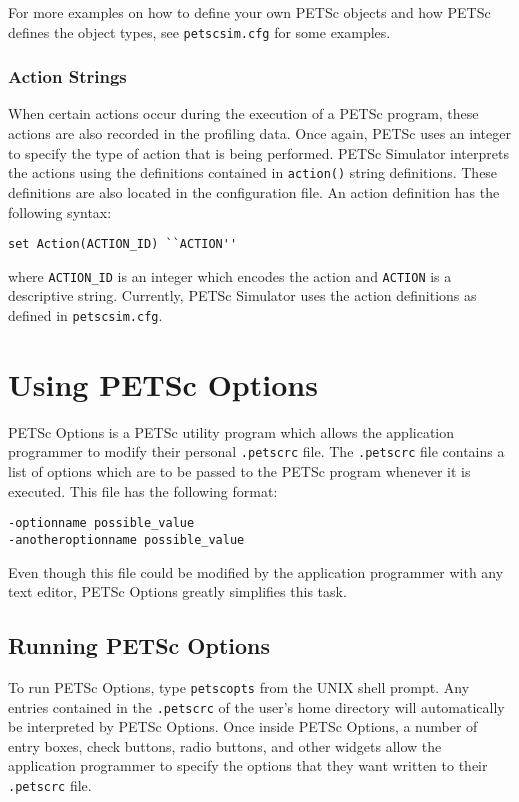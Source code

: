 For more examples on how to define your own PETSc objects and how PETSc defines the object types, see {\tt petscsim.cfg} for some examples.

\subsubsection{Action Strings}

When certain actions occur during the execution of a PETSc program, these actions are also recorded in the profiling data.  Once again, PETSc uses an integer to specify the type of action that is being performed.  PETSc Simulator interprets the actions using the definitions contained in {\tt action()} string definitions.  These definitions are also located in the configuration file.  An action definition has the following syntax:
\begin{verbatim}
set Action(ACTION_ID) ``ACTION''
\end{verbatim}
where {\tt ACTION\_ID} is an integer which encodes the action and {\tt ACTION} is a descriptive string.  Currently, PETSc Simulator uses the action definitions as defined in {\tt petscsim.cfg}.

\newpage

\section{Using PETSc Options}

PETSc Options is a PETSc utility program which allows the application programmer to modify their personal {\tt .petscrc} file.  The {\tt .petscrc} file contains a list of options which are to be passed to the PETSc program whenever it is executed.  This file has the following format:
\begin{verbatim}
-optionname possible_value
-anotheroptionname possible_value
\end{verbatim}
Even though this file could be modified by the application programmer with any text editor, PETSc Options greatly simplifies this task.

\subsection{Running PETSc Options}

To run PETSc Options, type {\tt petscopts} from the UNIX shell prompt.  Any entries contained in the {\tt .petscrc} of the user's home directory will automatically be interpreted by PETSc Options.  Once inside PETSc Options, a number of entry boxes, check buttons, radio buttons, and other widgets allow the application programmer to specify the options that they want written to their {\tt .petscrc} file.

